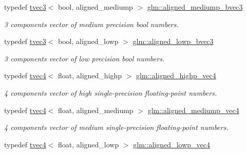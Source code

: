\begin{DoxyCompactItemize}
typedef \hyperlink{structglm_1_1tvec3}{tvec3}$<$ bool, aligned\+\_\+mediump $>$ \hyperlink{group__gtc__type__aligned_gaf2b80c6765cdb6cd9c4458ad5f0e66a2}{glm\+::aligned\+\_\+mediump\+\_\+bvec3}
\begin{DoxyCompactList}\small\item\em 3 components vector of medium precision bool numbers. \end{DoxyCompactList}\item 
\mbox{\label{group__gtc__type__aligned_ga5c8b3197e8ac78252c1b49be19ae0394}} 
typedef \hyperlink{structglm_1_1tvec3}{tvec3}$<$ bool, aligned\+\_\+lowp $>$ \hyperlink{group__gtc__type__aligned_ga5c8b3197e8ac78252c1b49be19ae0394}{glm\+::aligned\+\_\+lowp\+\_\+bvec3}
\begin{DoxyCompactList}\small\item\em 3 components vector of low precision bool numbers. \end{DoxyCompactList}\item 
\mbox{\label{group__gtc__type__aligned_ga4ec188da13bf0836f9a61b0b2b88425f}} 
typedef \hyperlink{structglm_1_1tvec4}{tvec4}$<$ float, aligned\+\_\+highp $>$ \hyperlink{group__gtc__type__aligned_ga4ec188da13bf0836f9a61b0b2b88425f}{glm\+::aligned\+\_\+highp\+\_\+vec4}
\begin{DoxyCompactList}\small\item\em 4 components vector of high single-\/precision floating-\/point numbers. \end{DoxyCompactList}\item 
\mbox{\label{group__gtc__type__aligned_ga4c09f5d9e1a7fa59a9bc9eef1adef368}} 
typedef \hyperlink{structglm_1_1tvec4}{tvec4}$<$ float, aligned\+\_\+mediump $>$ \hyperlink{group__gtc__type__aligned_ga4c09f5d9e1a7fa59a9bc9eef1adef368}{glm\+::aligned\+\_\+mediump\+\_\+vec4}
\begin{DoxyCompactList}\small\item\em 4 components vector of medium single-\/precision floating-\/point numbers. \end{DoxyCompactList}\item 
\mbox{\label{group__gtc__type__aligned_ga6792b3ad721290a69de969d6956c2cef}} 
typedef \hyperlink{structglm_1_1tvec4}{tvec4}$<$ float, aligned\+\_\+lowp $>$ \hyperlink{group__gtc__type__aligned_ga6792b3ad721290a69de969d6956c2cef}{glm\+::aligned\+\_\+lowp\+\_\+vec4}

\end{DoxyCompactItemize}
